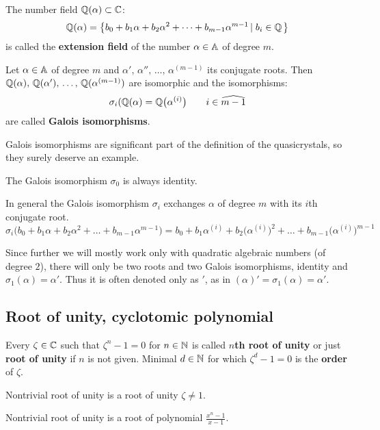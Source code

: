 \documentclass[text.tex]{subfiles}
\begin{document}
\begin{definition}
The number field $\mathbb{Q}(\alpha)\subset\mathbb{C}$: 
$$\mathbb{Q}(\alpha) = \left\{ b_0 + b_1\alpha + b_2\alpha^2 + \dots + b_{m-1}\alpha^{m-1} \left |\; b_i\in\mathbb{Q}\right. \right\}$$
is called the \textbf{extension field} of the number $\alpha\in\mathbb{A}$ of degree $m$.
\end{definition}

\begin{definition}
Let $\alpha\in\mathbb{A}$ of degree $m$ and $\alpha',\,\alpha'',\,\dots,\,\alpha^{(m-1)}$ its conjugate roots. Then $\mathbb{Q}(\alpha),\, \mathbb{Q}(\alpha'),\,\dots,\, \mathbb{Q}(\alpha^{(m-1)})$ are isomorphic and the isomorphisms:
$$\sigma_i(\mathbb{Q}(\alpha) = \mathbb{Q}\big(\alpha^{(i)}\big)\qquad i\in\widehat{m-1}$$
are called \textbf{Galois isomorphisms}.
\end{definition}

Galois isomorphisms are significant part of the definition of the quasicrystals, so they surely deserve an example. 

The Galois isomorphism $\sigma_0$ is always identity.

In general the Galois isomorphism $\sigma_i$ exchanges $\alpha$ of degree $m$ with its $i$th conjugate root. 
$$\sigma_i\big(b_0 + b_1\alpha + b_2\alpha^2 + \dots + b_{m-1}\alpha^{m-1}\big) = b_0 + b_1\alpha^{(i)} + b_2\big(\alpha^{(i)}\big)^2 + \dots + b_{m-1}\big(\alpha^{(i)}\big)^{m-1}$$

Since further we will mostly work only with quadratic algebraic numbers (of degree $2$), there will only be two roots and two Galois isomorphisms, identity and $\sigma_1(\alpha) = \alpha'$. Thus it is often denoted only as $'$, as in $(\alpha)' = \sigma_1(\alpha) = \alpha'$.

\subsection{Root of unity, cyclotomic polynomial}

\begin{definition}
Every $\zeta\in\mathbb{C}$ such that $\zeta^n-1=0$ for $n\in\mathbb{N}$ is called \textbf{$n$th root of unity} or just \textbf{root of unity} if $n$ is not given. Minimal $d\in\mathbb{N}$ for which $\zeta^d-1=0$ is the \textbf{order} of $\zeta$. 

Nontrivial root of unity is a root of unity $\zeta\neq 1$. 
\end{definition}

\begin{remark}
Nontrivial root of unity is a root of polynomial $\frac{x^n-1}{x-1}$.
\end{remark}
\end{document}
